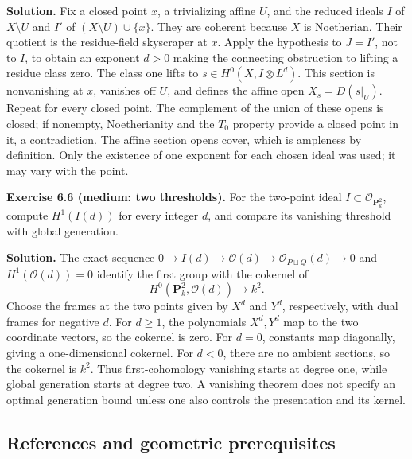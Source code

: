 \documentclass[11pt]{article}
\begin{document}
\textbf{Solution.} Fix a closed point \(x\), a trivializing affine
\(U\), and the reduced ideals \(I\) of \(X\setminus U\) and \(I'\) of
\((X\setminus U)\cup\{x\}\). They are coherent because \(X\) is
Noetherian. Their quotient is the residue-field skyscraper at \(x\).
Apply the hypothesis to \(J=I'\), not to \(I\), to obtain an exponent
\(d>0\) making the connecting obstruction to lifting a residue class
zero. The class one lifts to \(s\in H^0(X,I\otimes L^d)\). This section
is nonvanishing at \(x\), vanishes off \(U\), and defines the affine
open \(X_s=D(s|_U)\). Repeat for every closed point. The complement of
the union of these opens is closed; if nonempty, Noetherianity and the
\(T_0\) property provide a closed point in it, a contradiction. The
affine section opens cover, which is ampleness by definition. Only the
existence of one exponent for each chosen ideal was used; it may vary
with the point.

\textbf{Exercise 6.6 (medium: two thresholds).} For the two-point ideal
\(I\subset\mathcal O_{\mathbf P_k^2}\), compute \(H^1(I(d))\) for every
integer \(d\), and compare its vanishing threshold with global
generation.

\textbf{Solution.} The exact sequence
\(0\to I(d)\to\mathcal O(d)\to\mathcal O_{P\sqcup Q}(d)\to0\) and
\(H^1(\mathcal O(d))=0\) identify the first group with the cokernel of
\[
H^0(\mathbf P_k^2,\mathcal O(d))\longrightarrow k^2.
\] Choose the frames at the two points given by \(X^d\) and \(Y^d\),
respectively, with dual frames for negative \(d\). For \(d\ge1\), the
polynomials \(X^d,Y^d\) map to the two coordinate vectors, so the
cokernel is zero. For \(d=0\), constants map diagonally, giving a
one-dimensional cokernel. For \(d<0\), there are no ambient sections, so
the cokernel is \(k^2\). Thus first-cohomology vanishing starts at
degree one, while global generation starts at degree two. A vanishing
theorem does not specify an optimal generation bound unless one also
controls the presentation and its kernel.

\subsection{References and geometric
prerequisites}\label{references-and-geometric-prerequisites}
\end{document}
